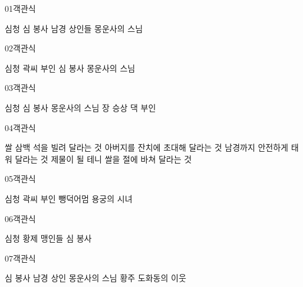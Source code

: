 \documentclass[fs9,seriesRus]{korfarm-base}
\begin{document}
\par\medskip
\kfBeginMC
\begin{kfQBlock}{01}{객관식}
\begin{kfChoices}
\kfChoice 심청
\kfChoice 심 봉사
\kfChoice 남경 상인들
\kfChoice 몽운사의 스님
\end{kfChoices}
\end{kfQBlock}
\begin{kfQBlock}{02}{객관식}
\begin{kfChoices}
\kfChoice 심청
\kfChoice 곽씨 부인
\kfChoice 심 봉사
\kfChoice 몽운사의 스님
\end{kfChoices}
\end{kfQBlock}
\begin{kfQBlock}{03}{객관식}
\begin{kfChoices}
\kfChoice 심청
\kfChoice 심 봉사
\kfChoice 몽운사의 스님
\kfChoice 장 승상 댁 부인
\end{kfChoices}
\end{kfQBlock}
\begin{kfQBlock}{04}{객관식}
\begin{kfChoices}
\kfChoice 쌀 삼백 석을 빌려 달라는 것
\kfChoice 아버지를 잔치에 초대해 달라는 것
\kfChoice 남경까지 안전하게 태워 달라는 것
\kfChoice 제물이 될 테니 쌀을 절에 바쳐 달라는 것
\end{kfChoices}
\end{kfQBlock}
\begin{kfQBlock}{05}{객관식}
\begin{kfChoices}
\kfChoice 심청
\kfChoice 곽씨 부인
\kfChoice 뺑덕어멈
\kfChoice 용궁의 시녀
\end{kfChoices}
\end{kfQBlock}
\begin{kfQBlock}{06}{객관식}
\begin{kfChoices}
\kfChoice 심청
\kfChoice 황제
\kfChoice 맹인들
\kfChoice 심 봉사
\end{kfChoices}
\end{kfQBlock}
\begin{kfQBlock}{07}{객관식}
\begin{kfChoices}
\kfChoice 심 봉사
\kfChoice 남경 상인
\kfChoice 몽운사의 스님
\kfChoice 황주 도화동의 이웃
\end{kfChoices}
\end{kfQBlock}
\end{document}
